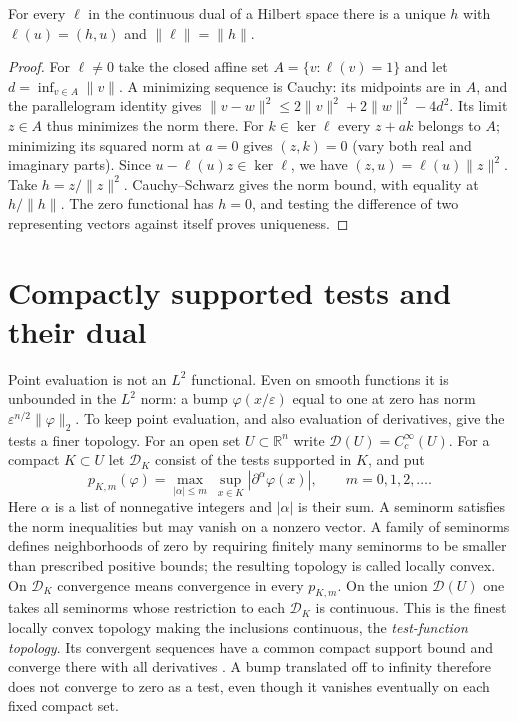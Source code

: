 \begin{proposition}\label{f:hilbert-representation}
For every $\ell$ in the continuous dual of a Hilbert space there is a unique $h$ with $\ell(u)=(h,u)$ and $\|\ell\|=\|h\|$.
\end{proposition}
\begin{proof}
For $\ell\ne0$ take the closed affine set $A=\{v:\ell(v)=1\}$ and let $d=\inf_{v\in A}\|v\|$. A minimizing sequence is Cauchy: its midpoints are in $A$, and the parallelogram identity gives $\|v-w\|^2\leq 2\|v\|^2+2\|w\|^2-4d^2$. Its limit $z\in A$ thus minimizes the norm there. For $k\in\ker\ell$ every $z+ak$ belongs to $A$; minimizing its squared norm at $a=0$ gives $(z,k)=0$ (vary both real and imaginary parts). Since $u-\ell(u)z\in\ker\ell$, we have $(z,u)=\ell(u)\|z\|^2$. Take $h=z/\|z\|^2$. Cauchy--Schwarz gives the norm bound, with equality at $h/\|h\|$. The zero functional has $h=0$, and testing the difference of two representing vectors against itself proves uniqueness.
\end{proof}

\section{Compactly supported tests and their dual}\label{f:test-topology}

Point evaluation is not an $L^2$ functional. Even on smooth functions it is unbounded in the $L^2$ norm: a bump $\varphi(x/\varepsilon)$ equal to one at zero has norm $\varepsilon^{n/2}\|\varphi\|_2$. To keep point evaluation, and also evaluation of derivatives, give the tests a finer topology. For an open set $U\subset\mathbb R^n$ write $\mathcal D(U)=C_c^\infty(U)$. For a compact $K\subset U$ let $\mathcal D_K$ consist of the tests supported in $K$, and put
\[
 p_{K,m}(\varphi)=\max_{|\alpha|\leq m}\ \sup_{x\in K}|\partial^\alpha\varphi(x)|,\qquad m=0,1,2,\ldots .
\]
Here $\alpha$ is a list of nonnegative integers and $|\alpha|$ is their sum. A seminorm satisfies the norm inequalities but may vanish on a nonzero vector. A family of seminorms defines neighborhoods of zero by requiring finitely many seminorms to be smaller than prescribed positive bounds; the resulting topology is called locally convex. On $\mathcal D_K$ convergence means convergence in every $p_{K,m}$. On the union $\mathcal D(U)$ one takes all seminorms whose restriction to each $\mathcal D_K$ is continuous. This is the finest locally convex topology making the inclusions continuous, the \emph{test-function topology}. Its convergent sequences have a common compact support bound and converge there with all derivatives \cite[Ch.~II, \S2.1]{HormI}. A bump translated off to infinity therefore does not converge to zero as a test, even though it vanishes eventually on each fixed compact set.

